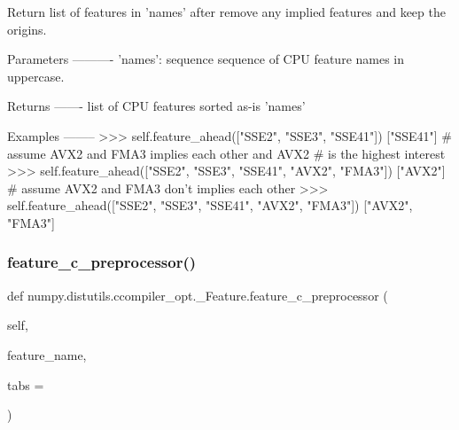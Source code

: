 \begin{DoxyVerb}Return list of features in 'names' after remove any
implied features and keep the origins.

Parameters
----------
'names': sequence
    sequence of CPU feature names in uppercase.

Returns
-------
list of CPU features sorted as-is 'names'

Examples
--------
>>> self.feature_ahead(["SSE2", "SSE3", "SSE41"])
["SSE41"]
# assume AVX2 and FMA3 implies each other and AVX2
# is the highest interest
>>> self.feature_ahead(["SSE2", "SSE3", "SSE41", "AVX2", "FMA3"])
["AVX2"]
# assume AVX2 and FMA3 don't implies each other
>>> self.feature_ahead(["SSE2", "SSE3", "SSE41", "AVX2", "FMA3"])
["AVX2", "FMA3"]
\end{DoxyVerb}
 \mbox{\label{classnumpy_1_1distutils_1_1ccompiler__opt_1_1__Feature_a04f8d6305d8996f7b58060332c89b4ab}} 
\subsubsection{\texorpdfstring{feature\+\_\+c\+\_\+preprocessor()}{feature\_c\_preprocessor()}}
{\footnotesize\ttfamily def numpy.\+distutils.\+ccompiler\+\_\+opt.\+\_\+\+Feature.\+feature\+\_\+c\+\_\+preprocessor (\begin{DoxyParamCaption}\item[{}]{self,  }\item[{}]{feature\+\_\+name,  }\item[{}]{tabs = {} }\end{DoxyParamCaption})}

